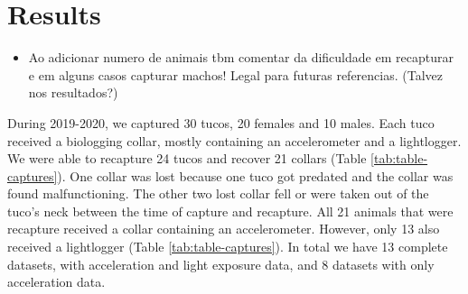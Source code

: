\documentclass[english,msc,numbers,hidelinks]{coppe}
\providecommand{\tightlist}{%
  \setlength{\itemsep}{0pt}\setlength{\parskip}{0pt}}
\begin{document}
  \hypertarget{results}{%
  \section{Results}\label{results}}
  \begin{itemize}
  \tightlist
  \item
    Ao adicionar numero de animais tbm comentar da dificuldade em recapturar e em alguns casos capturar machos! Legal para futuras referencias. (Talvez nos resultados?)
  \end{itemize}
  During 2019-2020, we captured 30 tucos, 20 females and 10 males. Each tuco received a biologging collar, mostly containing an accelerometer and a lightlogger. We were able to recapture 24 tucos and recover 21 collars (Table \ref{tab:table-captures}). One collar was lost because one tuco got predated and the collar was found malfunctioning. The other two lost collar fell or were taken out of the tuco's neck between the time of capture and recapture. All 21 animals that were recapture received a collar containing an accelerometer. However, only 13 also received a lightlogger (Table \ref{tab:table-captures}). In total we have 13 complete datasets, with acceleration and light exposure data, and 8 datasets with only acceleration data.
\end{document}
